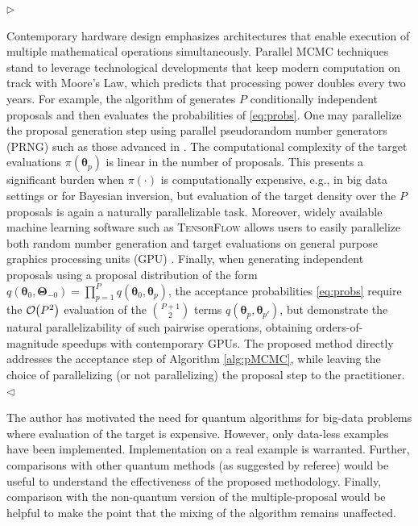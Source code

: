 \documentclass[12pt]{article}
\newenvironment{reply}{$\triangleright$\bfseries}{$\triangleleft$}
\renewenvironment{quote}
               {\list{}{\rightmargin\leftmargin}%
                \item\relax\normalfont}
               {\endlist}
\newcommand{\order}[1]{{\cal O}\hspace{-0.2em}\left( #1 \right)}
\newcommand{\ttheta}{\boldsymbol{\theta}}
\newcommand{\Ttheta}{\boldsymbol{\Theta}}
\begin{document}
\begin{reply}
\begin{quote}
	Contemporary hardware design emphasizes architectures that enable execution of multiple mathematical operations simultaneously. Parallel MCMC techniques stand to leverage technological developments that keep modern computation on track with Moore's Law, which predicts that processing power doubles every two years.  For example, the algorithm of \citet{tjelmeland2004using} generates $P$ conditionally independent proposals and then evaluates the probabilities of \eqref{eq:probs}.  One may parallelize the proposal generation step using parallel pseudorandom number generators (PRNG) such as those advanced in \citet{salmon2011parallel}. The computational complexity of the target evaluations $\pi(\ttheta_p)$ is linear in the number of proposals. This presents a significant burden when $\pi(\cdot)$ is computationally expensive, e.g., in big data settings or for Bayesian inversion, but evaluation of the target density over the $P$ proposals is again a naturally parallelizable task.  Moreover, widely available machine learning software such as \textsc{TensorFlow} allows users to easily parallelize both random number generation and target evaluations on general purpose graphics processing units (GPU) \citep{lao2020tfp}. Finally, when generating independent proposals using a proposal distribution of the form $q(\ttheta_0,\Ttheta_{-0})=\prod_{p=1}^Pq(\ttheta_0,\ttheta_{p})$, the acceptance probabilities \eqref{eq:probs} require the $\order{P^2}$ evaluation of the $P+1\choose 2$ terms $q(\ttheta_{p},\ttheta_{p'})$, but \citet{massive,holbrook2021scalable} demonstrate the natural parallelizability of such pairwise operations, obtaining orders-of-magnitude speedups with contemporary GPUs.  The proposed method directly addresses the acceptance step of Algorithm \ref{alg:pMCMC}, while leaving the choice of parallelizing (or not parallelizing) the proposal step to the practitioner.  
\end{quote}
\end{reply}


The author has motivated the need for quantum algorithms for big-data problems where evaluation of the target is expensive. However, only data-less examples have been implemented. Implementation on a real example is warranted. Further, comparisons with other quantum methods (as suggested by referee) would be useful to understand the effectiveness of the proposed methodology. Finally, comparison with the non-quantum version of the multiple-proposal would be helpful to make the point that the mixing of the algorithm remains unaffected.
\end{document}
